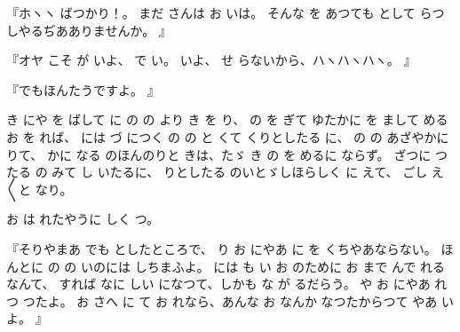『ホヽヽ
ばつかり！。
まだ
さんは
お
いは。
そんな
を
あつても
として
らつしやるぢあありませんか。
』

『オヤ
こそ
が
いよ、
で
い。
い\ninojiten{}よ、
せ
らないから、ハヽハヽハヽ。
』

『でもほんたうですよ。
』

き
にや
を
ばして
に
の
の
より
き
を
り、
の
を
ぎて
ゆたかに
を
まして
める
お
を
れば、
には
づ
につく
の
の
と
くて
くりとしたる
に、
の
の
あざやかに
りて、
かに
なる
のほんのりと
きは、たゞ
き
の
を
めるに
ならず。
ざつに
つたる
の
みて
し
いたるに、
りとしたる
のいとゞしほらしく
に
えて、
ごし
え〳〵と
なり。

お
は
れたやうに
しく
つ。

『そりやまあ
でも
としたところで、
り
お
にやあ
に
を
くちやあならない。
ほんとに
の
の
いのには
しちまふよ。
には
も
い
お
のために
お
まで
んで
れるなんて、
すれば
なに
しい
になつて、しかも
な
が
るだらう。
や
お
にやあ
れつ
つたよ。
お
さへ
に
て
お
れなら、あんな
お
なんか
なつたからつて
やあ
いよ。
』

